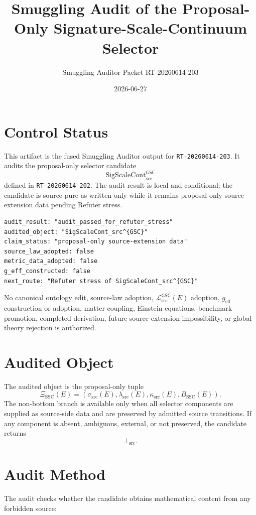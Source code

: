 \documentclass[11pt]{article}
\title{Smuggling Audit of the Proposal-Only Signature-Scale-Continuum Selector}
\author{Smuggling Auditor Packet RT-20260614-203}
\date{2026-06-27}
\newcommand{\MetricData}{\mathcal{L}_{\mathrm{src}}^{\mathsf{GSC}}}
\newcommand{\geff}{g_{\mathrm{eff}}}
\newcommand{\SigScaleCont}{\mathrm{SigScaleCont}_{\mathrm{src}}^{\mathsf{GSC}}}
\newcommand{\SigTok}{\sigma_{\mathrm{src}}}
\newcommand{\ScaleTok}{\lambda_{\mathrm{src}}}
\newcommand{\ContTok}{\kappa_{\mathrm{src}}}
\newcommand{\BottomSrc}{\bot_{\mathrm{src}}}
\begin{document}
\maketitle

\section{Control Status}

This artifact is the fused Smuggling Auditor output for
\texttt{RT-20260614-203}. It audits the proposal-only selector candidate
\[
  \SigScaleCont
\]
defined in \texttt{RT-20260614-202}. The audit result is local and
conditional: the candidate is source-pure as written only while it remains
proposal-only source-extension data pending Refuter stress.

\begin{verbatim}
audit_result: "audit_passed_for_refuter_stress"
audited_object: "SigScaleCont_src^{GSC}"
claim_status: "proposal-only source-extension data"
source_law_adopted: false
metric_data_adopted: false
g_eff_constructed: false
next_route: "Refuter stress of SigScaleCont_src^{GSC}"
\end{verbatim}

No canonical ontology edit, source-law adoption, \(\MetricData(E)\) adoption,
\(\geff\) construction or adoption, matter coupling, Einstein equations,
benchmark promotion, completed derivation, future source-extension
impossibility, or global theory rejection is authorized.

\section{Audited Object}

The audited object is the proposal-only tuple
\[
  \Xi_{\mathrm{SSC}}(E)
  =
  (\SigTok(E),\ScaleTok(E),\ContTok(E),B_{\mathrm{SSC}}(E)).
\]
The non-bottom branch is available only when all selector components are
supplied as source-side data and are preserved by admitted source transitions.
If any component is absent, ambiguous, external, or not preserved, the
candidate returns
\[
  \BottomSrc .
\]

\section{Audit Method}

The audit checks whether the candidate obtains mathematical content from any
forbidden source:
\end{document}
